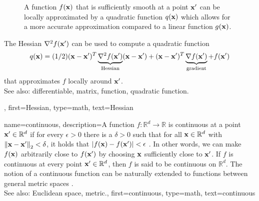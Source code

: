 {{\begin{figure}[H]
\begin{center}
		\vspace*{-5mm}
	\end{center}
	\caption{
		A function $f({\bf x})$ that is sufficiently smooth at a 
		point ${\bf x}'$ can be locally approximated by 
		a quadratic function $q({\bf x})$ which allows for a more accurate approximation 
		compared to a linear function $g({\bf x})$. \label{fig_quadapprox_hessian_dict}}
\end{figure}
		The Hessian $\nabla^2 f({\bf x}')$ can be used to compute a quadratic function 
		$$q({\bf x}) = (1/2) ({\bf x}- {\bf x}')^{T} \underbrace{\nabla^2 f({\bf x}')}_{\text{Hessian}} 
		({\bf x}- {\bf x}') +  ({\bf x}- {\bf x}')^{T} \underbrace{\nabla f({\bf x}')}_{\text{gradient}} 
		+ f({\bf x}')$$
		that approximates $f$ locally around ${\bf x}'$. 
        		\\
		See also: differentiable, matrix, function, quadratic function. }, 
	first={Hessian},
	type=math,
	text={Hessian}
}

{name={continuous}, 
description={A function $f: \mathbb{R}^{d} \to \mathbb{R}$ is 
	 continuous at a point ${\bf x}' \in \mathbb{R}^{d}$ if for 
	 every $\epsilon > 0$ there is a $\delta > 0$ such that for all 
	 ${\bf x} \in \mathbb{R}^{d}$ with $\mleft\lVert {\bf x} - {\bf x}' \mright\rVert_{2} < \delta$, 
	 it holds that $|f({\bf x}) - f({\bf x}')| < \epsilon$ \cite{RudinBookPrinciplesMatheAnalysis}. 
	 In other words, we can make $f({\bf x})$ arbitrarily close to $f({\bf x}')$ 
	 by choosing ${\bf x}$ sufficiently close to ${\bf x}'$. If $f$ is continuous 
	 at every point ${\bf x}' \in \mathbb{R}^{d}$, then $f$ is said to be 
	 continuous on $\mathbb{R}^{d}$. The notion of a continuous 
	 function can be naturally extended to functions between general metric 
	 spaces \cite{RudinBookPrinciplesMatheAnalysis}.\\
		See also: Euclidean space, metric.},
	first={continuous},
	type=math,
	text={continuous}
}

